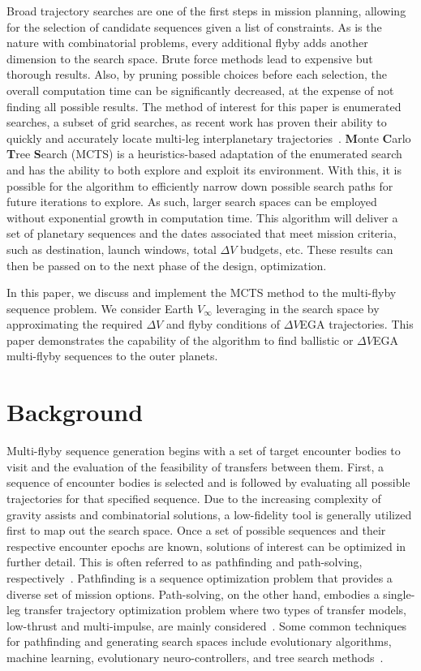 \documentclass[letterpaper, preprint, paper,11pt]{AAS}	%
\begin{document}
Broad trajectory searches are one of the first steps in mission planning, allowing for the selection of candidate sequences given a list of constraints. As is the nature with combinatorial problems, every additional flyby adds another dimension to the search space. Brute force methods lead to expensive but thorough results. Also, by pruning possible choices before each selection, the overall computation time can be significantly decreased, at the expense of not finding all possible results. The method of interest for this paper is enumerated searches, a subset of grid searches, as recent work has proven their ability to quickly and accurately locate multi-leg interplanetary trajectories~\cite{Hennes2015}. \textbf{M}onte \textbf{C}arlo \textbf{T}ree \textbf{S}earch (MCTS) is a heuristics-based adaptation of the enumerated search and has the ability to both explore and exploit its environment. With this, it is possible for the algorithm to efficiently narrow down possible search paths for future iterations to explore. As such, larger search spaces can be employed without exponential growth in computation time. This algorithm will deliver a set of planetary sequences and the dates associated that meet mission criteria, such as destination, launch windows, total $\Delta V$ budgets, etc. These results can then be passed on to the next phase of the design, optimization.

In this paper, we discuss and implement the MCTS method to the multi-flyby sequence problem. We consider Earth $V_\infty$ leveraging in the search space by approximating the required $\Delta V$ and flyby conditions of $\Delta V$EGA trajectories. This paper demonstrates the capability of the algorithm to find ballistic or $\Delta V$EGA multi-flyby sequences to the outer planets.

\section*{Background}

Multi-flyby sequence generation begins with a set of target encounter bodies to visit and the evaluation of the feasibility of transfers between them. First, a sequence of encounter bodies is selected and is followed by evaluating all possible trajectories for that specified sequence. Due to the increasing complexity of gravity assists and combinatorial solutions, a low-fidelity tool is generally utilized first to map out the search space. Once a set of possible sequences and their respective encounter epochs are known, solutions of interest can be optimized in further detail. This is often referred to as pathfinding and path-solving, respectively~\cite{Hughes2016}. Pathfinding is a sequence optimization problem that provides a diverse set of mission options. Path-solving, on the other hand, embodies a single-leg transfer trajectory optimization problem where two types of transfer models, low-thrust and multi-impulse, are mainly considered~\cite{Li2019}. Some common techniques for pathfinding and generating search spaces include evolutionary algorithms, machine learning, evolutionary neuro-controllers, and tree search methods~\cite{Izzo2019}.
\end{document}
